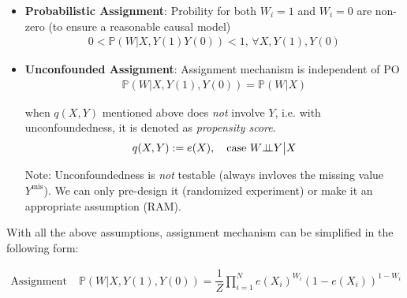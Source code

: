 \begin{itemize}[topsep=2pt,itemsep=0pt]
\begin{itemize}[topsep=2pt,itemsep=0pt]
        \item \textbf{Probabilistic Assignment}: Probility for both $ W_i=1 $ and $ W_i=0 $ are non-zero (to ensure a reasonable causal model)
        \begin{align}
            0<\mathbb{P}(W|X,Y(1)Y(0))<1,\,\forall X,Y(1),Y(0) 
        \end{align}
        
        \item \textbf{Unconfounded Assignment}: Assignment mechanism is independent of PO
        \begin{align}
            \mathbb{P}(W|X,Y(1),Y(0))=\mathbb{P}(W|X)
        \end{align}

        when $ q(X,Y) $ mentioned above does \textit{not} involve $ Y $, i.e. with unconfoundedness, it is denoted as \textit{propensity score}.
        \begin{align}
            q(X,Y) := e(X),\quad \text{case } W\bot\!\!\!\bot Y\big| X
        \end{align}

        Note: Unconfoundedness is \textit{not} testable (always invloves the missing value $ Y^\mathrm{mis}  $). We can only pre-design it (randomized experiment) or make it an appropriate assumption (RAM).
    \end{itemize}
\end{itemize}


    
\begin{point}
    With all the above assumptions, assignment mechanism can be simplified in the following form:
\end{point}

\begin{align}
    \text{Assignment Mechanism:}\,&\mathbb{P}(W|X,Y(1),Y(0))=\dfrac{1}{Z}\prod_{i=1}^N e(X_i)^{W_i}(1-e(X_i))^{1-W_i}\\
\end{align}




